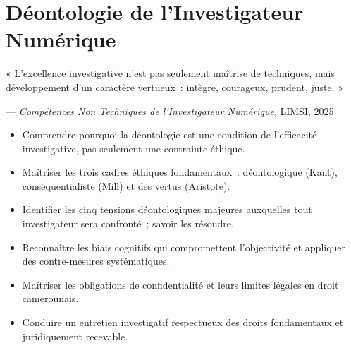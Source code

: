 
\chapter{Déontologie de l'Investigateur Numérique}
\label{chap:deonto}

\epigraph{%
    « L'excellence investigative n'est pas seulement maîtrise de techniques,
    mais développement d'un caractère vertueux~: intègre, courageux,
    prudent, juste. »%
}{--- \textit{Compétences Non Techniques de l'Investigateur Numérique},
LIMSI, 2025}


\begin{boxobjectifs}
\begin{itemize}
    \item Comprendre pourquoi la déontologie est une condition de
          l'efficacité investigative, pas seulement une contrainte éthique.
    \item Maîtriser les trois cadres éthiques fondamentaux~: déontologique
          (Kant), conséquentialiste (Mill) et des vertus (Aristote).
    \item Identifier les cinq tensions déontologiques majeures auxquelles
          tout investigateur sera confronté~; savoir les résoudre.
    \item Reconnaître les biais cognitifs qui compromettent l'objectivité
          et appliquer des contre-mesures systématiques.
    \item Maîtriser les obligations de confidentialité et leurs limites
          légales en droit camerounais.
    \item Conduire un entretien investigatif respectueux des droits
          fondamentaux et juridiquement recevable.
\end{itemize}
\end{boxobjectifs}

